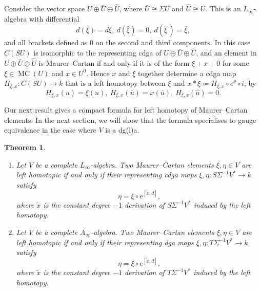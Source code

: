 \documentclass[a4paper,reqno]{amsart}
\theoremstyle{plain}
\newtheorem{thm}{Theorem}[section]
\theoremstyle{definition}
\theoremstyle{remark}
\DeclareMathOperator{\MC}{MC}
\begin{document}
Consider the vector space $U \oplus \bar{U} \oplus \widehat{U}$, where $\bar{U} \cong \Sigma U$ and $\widehat{U} \cong U$. 
This is an $L_{\infty}$-algebra with differential
\[
  d(\xi) = d\xi,\ d(\bar{\xi}) = 0,\ d(\widehat{\xi}\,) = \bar{\xi},
\]
and all brackets defined as 0 on the second and third components.
In this case $C(SU)$ is isomorphic to the representing cdga of $U \oplus \bar{U} \oplus \widehat{U}$, and an element in $U \oplus \bar{U} \oplus \widehat{U}$ is Maurer--Cartan if and only if it is of the form $\xi + x + 0$ for some $\xi \in \MC(U)$ and $x \in U^0$.
Hence $x$ and $\xi$ together determine a cdga map 
$H_{\xi,x} \colon C(SU) \to k$
that is a left homotopy between $\xi$ and $x * \xi \coloneqq H_{\xi,x} \circ e^{\theta} \circ i$, by
\[
  H_{\xi,x}(u) = \xi(u),\  H_{\xi,x}(\bar{u}) = x(\bar{u}),\ H_{\xi,x}(\widehat{u}) = 0. 
\]

Our next result gives a compact formula for left homotopy of Maurer--Cartan elements. In the next section, we will show that the formula specialises to gauge equivalence in the case where $V$ is a dg(l)a.

\begin{thm} \hfill
  \label{result:gauge_short_a}
  \begin{enumerate}
    \item Let $V$ be a complete $L_{\infty}$-algebra. Two Maurer--Cartan elements $\xi, \eta \in V$ are left homotopic if and only if their representing cdga maps $\xi, \eta \colon S\Sigma^{-1}V^* \to k$ satisfy
      \[
        \eta = \xi \circ e^{[\tilde{x},d]}, 
      \]
      where $\tilde{x}$ is the constant degree $-1$ derivation of $S\Sigma^{-1}V^*$ induced by the left homotopy.

    \item Let $V$ be a complete $A_{\infty}$-algebra. Two Maurer--Cartan elements $\xi, \eta \in V$ are left homotopic if and only if their representing dga maps $\xi, \eta \colon T\Sigma^{-1}V^* \to k$ satisfy
      \[
        \eta = \xi \circ e^{[\tilde{x},d]}, 
      \]
      where $\tilde{x}$ is the constant degree $-1$ derivation of $T\Sigma^{-1}V^*$ induced by the left homotopy.
  \end{enumerate}
\end{thm}
\end{document}
